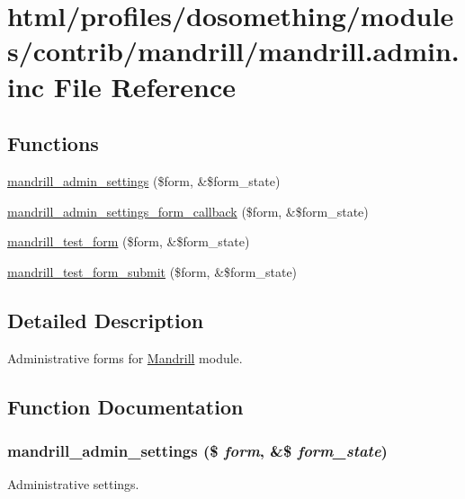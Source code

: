 \hypertarget{mandrill_8admin_8inc}{
\section{html/profiles/dosomething/modules/contrib/mandrill/mandrill.admin.inc File Reference}
\label{mandrill_8admin_8inc}
}
\subsection*{Functions}
\begin{DoxyCompactItemize}
\item 
\hyperlink{mandrill_8admin_8inc_af3b66f4115a5989497475db91f27b1b3}{mandrill\_\-admin\_\-settings} (\$form, \&\$form\_\-state)
\item 
\hyperlink{mandrill_8admin_8inc_aad599427ae550bd4eb563a125cb0f0d7}{mandrill\_\-admin\_\-settings\_\-form\_\-callback} (\$form, \&\$form\_\-state)
\item 
\hyperlink{mandrill_8admin_8inc_a11577b4c1bb900bbdea89e9d1b0065f2}{mandrill\_\-test\_\-form} (\$form, \&\$form\_\-state)
\item 
\hyperlink{mandrill_8admin_8inc_a0bc4ea8ade8651cdc39af842f904906a}{mandrill\_\-test\_\-form\_\-submit} (\$form, \&\$form\_\-state)
\end{DoxyCompactItemize}


\subsection{Detailed Description}
Administrative forms for \hyperlink{classMandrill}{Mandrill} module. 

\subsection{Function Documentation}
\hypertarget{mandrill_8admin_8inc_af3b66f4115a5989497475db91f27b1b3}{
\subsubsection[{mandrill\_\-admin\_\-settings}]{\setlength{\rightskip}{0pt plus 5cm}mandrill\_\-admin\_\-settings (\$ {\em form}, \/  \&\$ {\em form\_\-state})}}
\label{mandrill_8admin_8inc_af3b66f4115a5989497475db91f27b1b3}
Administrative settings.

